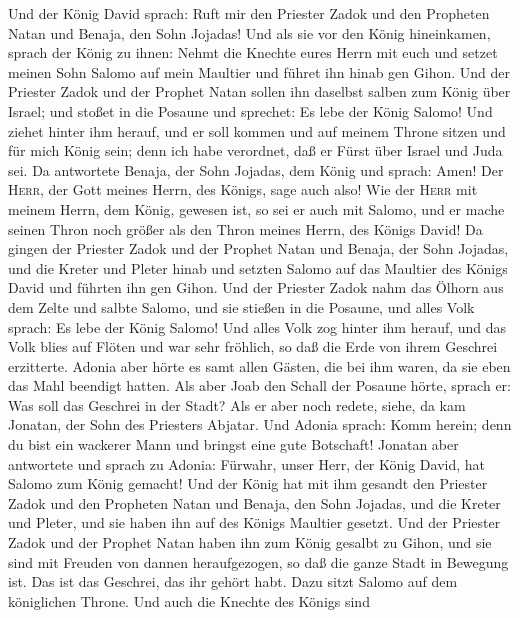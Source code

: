 Und der König David sprach: Ruft mir den Priester Zadok und den
Propheten Natan und Benaja, den Sohn Jojadas! Und als sie vor den König
hineinkamen,  sprach der König zu ihnen: Nehmt die
Knechte eures Herrn mit euch und setzet meinen Sohn Salomo auf mein
Maultier und führet ihn hinab gen Gihon.  Und der
Priester Zadok und der Prophet Natan sollen ihn daselbst salben zum
König über Israel; und stoßet in die Posaune und sprechet: Es lebe der
König Salomo!  Und ziehet hinter ihm herauf, und er soll
kommen und auf meinem Throne sitzen und für mich König sein; denn ich
habe verordnet, daß er Fürst über Israel und Juda sei. 
Da antwortete Benaja, der Sohn Jojadas, dem König und sprach: Amen! Der
\textsc{Herr}, der Gott meines Herrn, des Königs, sage auch also!
 Wie der \textsc{Herr} mit meinem Herrn, dem König,
gewesen ist, so sei er auch mit Salomo, und er mache seinen Thron noch
größer als den Thron meines Herrn, des Königs David!  Da
gingen der Priester Zadok und der Prophet Natan und Benaja, der Sohn
Jojadas, und die Kreter und Pleter hinab und setzten Salomo auf das
Maultier des Königs David und führten ihn gen Gihon.  Und
der Priester Zadok nahm das Ölhorn aus dem Zelte und salbte Salomo, und
sie stießen in die Posaune, und alles Volk sprach: Es lebe der König
Salomo!  Und alles Volk zog hinter ihm herauf, und das
Volk blies auf Flöten und war sehr fröhlich, so daß die Erde von ihrem
Geschrei erzitterte.  Adonia aber hörte es samt allen
Gästen, die bei ihm waren, da sie eben das Mahl beendigt hatten. Als
aber Joab den Schall der Posaune hörte, sprach er: Was soll das Geschrei
in der Stadt?  Als er aber noch redete, siehe, da kam
Jonatan, der Sohn des Priesters Abjatar. Und Adonia sprach: Komm herein;
denn du bist ein wackerer Mann und bringst eine gute Botschaft!
 Jonatan aber antwortete und sprach zu Adonia: Fürwahr,
unser Herr, der König David, hat Salomo zum König gemacht!
 Und der König hat mit ihm gesandt den Priester Zadok und
den Propheten Natan und Benaja, den Sohn Jojadas, und die Kreter und
Pleter, und sie haben ihn auf des Königs Maultier gesetzt.
 Und der Priester Zadok und der Prophet Natan haben ihn
zum König gesalbt zu Gihon, und sie sind mit Freuden von dannen
heraufgezogen, so daß die ganze Stadt in Bewegung ist. Das ist das
Geschrei, das ihr gehört habt.  Dazu sitzt Salomo auf dem
königlichen Throne.  Und auch die Knechte des Königs sind
